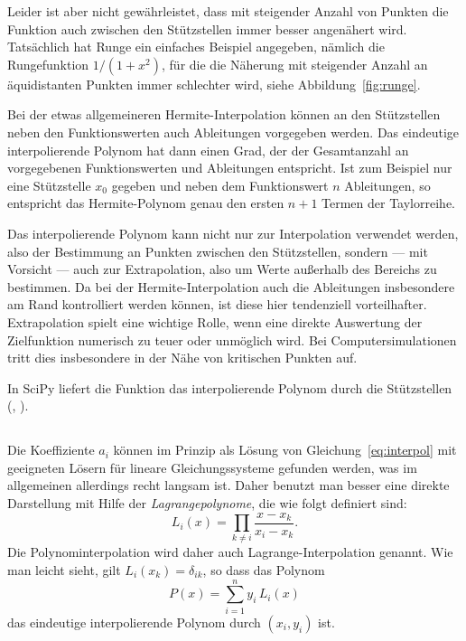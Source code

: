 Leider ist aber nicht gewährleistet, dass mit steigender Anzahl von
Punkten die Funktion auch zwischen den Stützstellen immer besser
angenähert wird. Tatsächlich hat Runge ein einfaches Beispiel
angegeben, nämlich die Rungefunktion $1/(1+x^2)$, für die die Näherung
mit steigender Anzahl an äquidistanten Punkten immer schlechter wird,
siehe Abbildung~\ref{fig:runge}.

Bei der etwas allgemeineren Hermite-Interpolation können an den
Stützstellen neben den Funktionswerten auch Ableitungen vorgegeben
werden. Das eindeutige interpolierende Polynom hat dann einen Grad,
der der Gesamtanzahl an vorgegebenen Funktionswerten und Ableitungen
entspricht. Ist zum Beispiel nur eine Stützstelle $x_0$ gegeben und
neben dem Funktionswert $n$ Ableitungen, so entspricht das
Hermite-Polynom genau den ersten $n+1$ Termen der Taylorreihe.

Das interpolierende Polynom kann nicht nur zur Interpolation verwendet
werden, also der Bestimmung an Punkten zwischen den Stützstellen,
sondern --- mit Vorsicht --- auch zur Extrapolation, also um Werte
außerhalb des Bereichs zu bestimmen. Da bei der Hermite-Interpolation
auch die Ableitungen insbesondere am Rand kontrolliert werden können,
ist diese hier tendenziell vorteilhafter. Extrapolation spielt eine
wichtige Rolle, wenn eine direkte Auswertung der Zielfunktion
numerisch zu teuer oder unmöglich wird. Bei Computersimulationen tritt
dies insbesondere in der Nähe von kritischen Punkten auf.

In SciPy liefert die Funktion 
das interpolierende Polynom durch die Stützstellen (,
).

\subsection{}

Die Koeffiziente $a_i$ können im Prinzip als Lösung von
Gleichung~\eqref{eq:interpol} mit geeigneten Lösern für lineare
Gleichungssysteme gefunden werden, was im allgemeinen allerdings recht
langsam ist. Daher benutzt man besser eine direkte Darstellung mit
Hilfe der \emph{Lagrangepolynome}, die wie folgt definiert sind:
\begin{equation}
  \label{eq:lagrange}
  L_i(x) = \prod_{k\neq i} \frac{x-x_k}{x_i-x_k}.
\end{equation}
Die Polynominterpolation wird daher auch Lagrange-Interpolation
genannt.  Wie man leicht sieht, gilt $L_i(x_k) = \delta_{ik}$, so dass
das Polynom
\begin{equation}
  P(x) = \sum_{i=1}^n y_i\,L_i(x)
\end{equation}
das eindeutige interpolierende Polynom durch $(x_i, y_i)$
ist.

